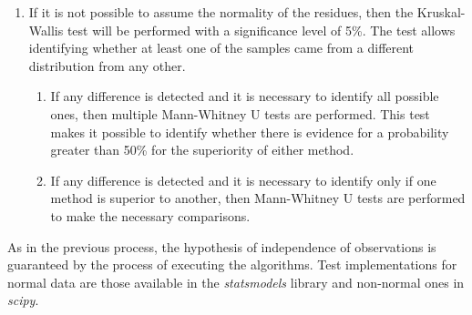 \begin{enumerate}
\begin{enumerate}
					\end{enumerate}
					\item If it is not possible to assume the normality of the residues, then the Kruskal-Wallis test will be performed with a significance level of 5\%. The test allows identifying whether at least one of the samples came from a different distribution from any other.
					\begin{enumerate}
						\item If any difference is detected and it is necessary to identify all possible ones, then multiple Mann-Whitney U tests are performed. This test makes it possible to identify whether there is evidence for a probability greater than 50\% for the superiority of either method.
						\item If any difference is detected and it is necessary to identify only if one method is superior to another, then Mann-Whitney U tests are performed to make the necessary comparisons.
					\end{enumerate}
				\end{enumerate}
				As in the previous process, the hypothesis of independence of observations is guaranteed by the process of executing the algorithms. Test implementations for normal data are those available in the \textit{statsmodels} library and non-normal ones in \textit{scipy}.
				
